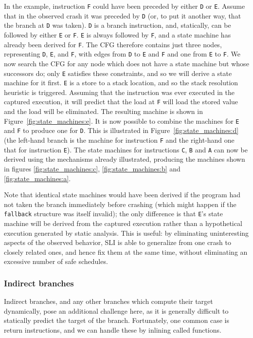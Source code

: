 \documentclass[10pt,letter,twocolumn]{sigplanconf}
\begin{document}
In the example, instruction \verb|F| could have been preceded by
either \verb|D| or \verb|E|.  Assume that in the observed crash it was
preceded by \verb|D| (or, to put it another way, that the branch at
\verb|D| was taken).  \verb|D| is a branch instruction, and,
statically, can be followed by either \verb|E| or \verb|F|.  \verb|E|
is always followed by \verb|F|, and a state machine has already been
derived for \verb|F|.  The CFG therefore contains just three nodes,
representing \verb|D|, \verb|E|, and \verb|F|, with edges from
\verb|D| to \verb|E| and \verb|F| and one from \verb|E| to \verb|F|.
We now search the CFG for any node which does not have a state machine
but whose successors do; only \verb|E| satisfies these constraints,
and so we will derive a state machine for it first.  \verb|E| is a
store to a stack location, and so the stack resolution heuristic is
triggered.  Assuming that the instruction was ever executed in the
captured execution, it will predict that the load at \verb|F| will
load the stored value and the load will be eliminated.  The resulting
machine is shown in Figure~\ref{fig:state_machines:e}.  It is now
possible to combine the machines for \verb|E| and \verb|F| to produce
one for \verb|D|.  This is illustrated in
Figure~\ref{fig:state_machines:d} (the left-hand branch is the machine
for instruction \verb|F| and the right-hand one that for instruction
\verb|E|).  The state machines for instructions \verb|C|, \verb|B| and
\verb|A| can now be derived using the mechanisms already illustrated,
producing the machines shown in figures \ref{fig:state_machines:c},
\ref{fig:state_machines:b} and \ref{fig:state_machines:a}.

Note that identical state machines would have been derived if the
program had not taken the branch immediately before crashing (which
might happen if the \verb|fallback| structure was itself invalid); the
only difference is that \verb|E|'s state machine will be derived from
the captured execution rather than a hypothetical execution generated
by static analysis.  This is useful: by eliminating uninteresting
aspects of the observed behavior, SLI is able to generalize from one
crash to closely related ones, and hence fix them at the same time,
without eliminating an excessive number of safe schedules.

\subsubsection{Indirect branches}
\label{sect:indirect_branches}
Indirect branches, and any other branches which compute their target
dynamically, pose an additional challenge here, as it is generally
difficult to statically predict the target of the branch.
Fortunately, one common case is return instructions, and we can handle
these by inlining called functions.
\end{document}
